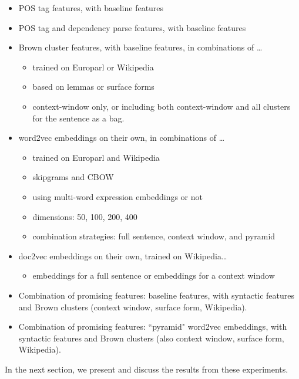 \begin{itemize}
  \item POS tag features, with baseline features
  \item POS tag and dependency parse features, with baseline features

  \item Brown cluster features, with baseline features, in combinations of
  \dots{}
    \begin{itemize}
      \item trained on Europarl or Wikipedia
      \item based on lemmas or surface forms
      \item context-window only, or including both context-window and all
      clusters for the sentence as a bag.
    \end{itemize}

  \item word2vec embeddings on their own, in combinations of \dots{}
    \begin{itemize}
      \item trained on Europarl and Wikipedia
      \item skipgrams and CBOW
      \item using multi-word expression embeddings or not
      \item dimensions: 50, 100, 200, 400
      \item combination strategies: full sentence, context window, and pyramid
    \end{itemize}

  \item doc2vec embeddings on their own, trained on Wikipedia\dots{}
    \begin{itemize}
      \item embeddings for a full sentence or embeddings for a context window
    \end{itemize}

  \item Combination of promising features: baseline features, with syntactic
  features and Brown clusters (context window, surface form, Wikipedia).
  \item Combination of promising features: ``pyramid" word2vec embeddings, with
  syntactic features and Brown clusters (also context window, surface form,
  Wikipedia).
\end{itemize}

In the next section, we present and discuss the results from these experiments.

